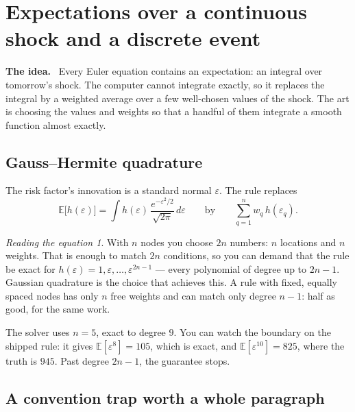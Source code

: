 \documentclass[10pt,a4paper]{article}
\newenvironment{idea}{\begin{shaded}\noindent\textbf{The idea.}\ }{\end{shaded}}
\theoremstyle{plain}
\theoremstyle{remark}
\newtheorem*{reading}{Reading the equation}
\newcommand{\E}{\mathbb{E}}
\begin{document}
\section{Expectations over a continuous shock and a discrete event}
\label{sec:quad}

\begin{idea}
Every Euler equation contains an expectation: an integral over tomorrow's shock. The computer cannot
integrate exactly, so it replaces the integral by a weighted average over a few well-chosen values of
the shock. The art is choosing the values and weights so that a handful of them integrate a smooth
function almost exactly.
\end{idea}

\subsection{Gauss--Hermite quadrature}

The risk factor's innovation is a standard normal $\varepsilon$. The rule replaces
\begin{equation}
  \E\big[h(\varepsilon)\big] = \int h(\varepsilon)\,\frac{e^{-\varepsilon^2/2}}{\sqrt{2\pi}}\,d\varepsilon
  \qquad\text{by}\qquad
  \sum_{q=1}^{n} w_q\,h(\varepsilon_q).
\end{equation}

\begin{reading}
With $n$ nodes you choose $2n$ numbers: $n$ locations and $n$ weights. That is enough to match $2n$
conditions, so you can demand that the rule be exact for $h(\varepsilon) = 1,\varepsilon,\dots,
\varepsilon^{2n-1}$ --- every polynomial of degree up to $2n-1$. Gaussian quadrature is the choice
that achieves this. A rule with fixed, equally spaced nodes has only $n$ free weights and can match
only degree $n-1$: half as good, for the same work.
\end{reading}

\noindent The solver uses $n=5$, exact to degree $9$. You can watch the boundary on the shipped rule:
it gives $\E[\varepsilon^8]=105$, which is exact, and $\E[\varepsilon^{10}] = 825$, where the truth is
$945$. Past degree $2n-1$, the guarantee stops.

\subsection{A convention trap worth a whole paragraph}
\end{document}
